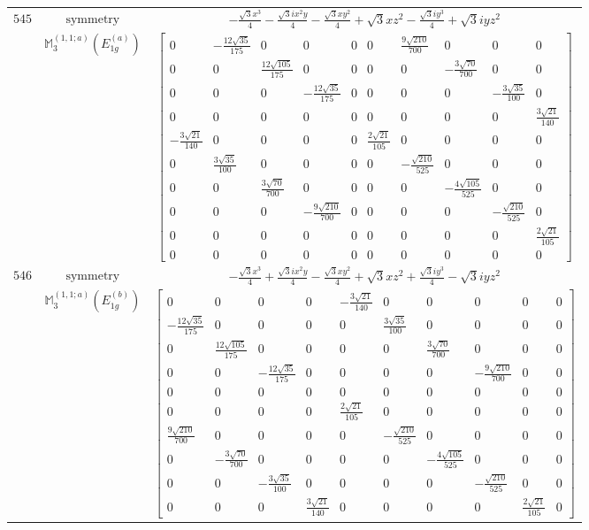 \documentclass[fleqn,8pt,landscape]{jsarticle}
\begin{document}
\begin{longtable}{ccc}
$ 545 $ & $ \text{symmetry} $ & $ - \frac{\sqrt{3} x^{3}}{4} - \frac{\sqrt{3} i x^{2} y}{4} - \frac{\sqrt{3} x y^{2}}{4} + \sqrt{3} x z^{2} - \frac{\sqrt{3} i y^{3}}{4} + \sqrt{3} i y z^{2} $ \\
$  $ & $ \mathbb{M}_{3}^{(1,1;a)}(E_{1g}^{(a)}) $ & $ \begin{bmatrix} 0 & - \frac{12 \sqrt{35}}{175} & 0 & 0 & 0 & 0 & \frac{9 \sqrt{210}}{700} & 0 & 0 & 0 \\ 0 & 0 & \frac{12 \sqrt{105}}{175} & 0 & 0 & 0 & 0 & - \frac{3 \sqrt{70}}{700} & 0 & 0 \\ 0 & 0 & 0 & - \frac{12 \sqrt{35}}{175} & 0 & 0 & 0 & 0 & - \frac{3 \sqrt{35}}{100} & 0 \\ 0 & 0 & 0 & 0 & 0 & 0 & 0 & 0 & 0 & \frac{3 \sqrt{21}}{140} \\ - \frac{3 \sqrt{21}}{140} & 0 & 0 & 0 & 0 & \frac{2 \sqrt{21}}{105} & 0 & 0 & 0 & 0 \\ 0 & \frac{3 \sqrt{35}}{100} & 0 & 0 & 0 & 0 & - \frac{\sqrt{210}}{525} & 0 & 0 & 0 \\ 0 & 0 & \frac{3 \sqrt{70}}{700} & 0 & 0 & 0 & 0 & - \frac{4 \sqrt{105}}{525} & 0 & 0 \\ 0 & 0 & 0 & - \frac{9 \sqrt{210}}{700} & 0 & 0 & 0 & 0 & - \frac{\sqrt{210}}{525} & 0 \\ 0 & 0 & 0 & 0 & 0 & 0 & 0 & 0 & 0 & \frac{2 \sqrt{21}}{105} \\ 0 & 0 & 0 & 0 & 0 & 0 & 0 & 0 & 0 & 0 \end{bmatrix} $ \\ \hline
$ 546 $ & $ \text{symmetry} $ & $ - \frac{\sqrt{3} x^{3}}{4} + \frac{\sqrt{3} i x^{2} y}{4} - \frac{\sqrt{3} x y^{2}}{4} + \sqrt{3} x z^{2} + \frac{\sqrt{3} i y^{3}}{4} - \sqrt{3} i y z^{2} $ \\
$  $ & $ \mathbb{M}_{3}^{(1,1;a)}(E_{1g}^{(b)}) $ & $ \begin{bmatrix} 0 & 0 & 0 & 0 & - \frac{3 \sqrt{21}}{140} & 0 & 0 & 0 & 0 & 0 \\ - \frac{12 \sqrt{35}}{175} & 0 & 0 & 0 & 0 & \frac{3 \sqrt{35}}{100} & 0 & 0 & 0 & 0 \\ 0 & \frac{12 \sqrt{105}}{175} & 0 & 0 & 0 & 0 & \frac{3 \sqrt{70}}{700} & 0 & 0 & 0 \\ 0 & 0 & - \frac{12 \sqrt{35}}{175} & 0 & 0 & 0 & 0 & - \frac{9 \sqrt{210}}{700} & 0 & 0 \\ 0 & 0 & 0 & 0 & 0 & 0 & 0 & 0 & 0 & 0 \\ 0 & 0 & 0 & 0 & \frac{2 \sqrt{21}}{105} & 0 & 0 & 0 & 0 & 0 \\ \frac{9 \sqrt{210}}{700} & 0 & 0 & 0 & 0 & - \frac{\sqrt{210}}{525} & 0 & 0 & 0 & 0 \\ 0 & - \frac{3 \sqrt{70}}{700} & 0 & 0 & 0 & 0 & - \frac{4 \sqrt{105}}{525} & 0 & 0 & 0 \\ 0 & 0 & - \frac{3 \sqrt{35}}{100} & 0 & 0 & 0 & 0 & - \frac{\sqrt{210}}{525} & 0 & 0 \\ 0 & 0 & 0 & \frac{3 \sqrt{21}}{140} & 0 & 0 & 0 & 0 & \frac{2 \sqrt{21}}{105} & 0 \end{bmatrix} $ \\ \hline

\end{longtable}
\end{document}
